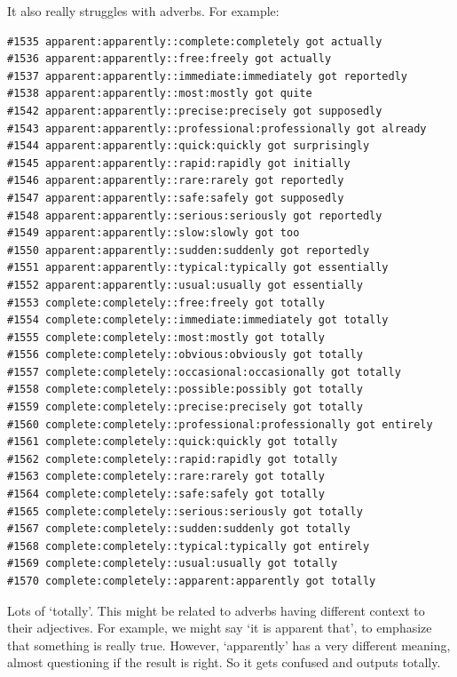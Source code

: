 \documentclass[12pt]{article}
\theoremstyle{definitionstyle}
\begin{document}
\begin{enumerate}[leftmargin=\labelsep]
\begin{enumerate}[label=\textbf{(\alph*)}]
                 It also really struggles with adverbs. For example:
                 \begin{lstlisting}
#1535 apparent:apparently::complete:completely got actually
#1536 apparent:apparently::free:freely got actually
#1537 apparent:apparently::immediate:immediately got reportedly
#1538 apparent:apparently::most:mostly got quite
#1542 apparent:apparently::precise:precisely got supposedly
#1543 apparent:apparently::professional:professionally got already
#1544 apparent:apparently::quick:quickly got surprisingly
#1545 apparent:apparently::rapid:rapidly got initially
#1546 apparent:apparently::rare:rarely got reportedly
#1547 apparent:apparently::safe:safely got supposedly
#1548 apparent:apparently::serious:seriously got reportedly
#1549 apparent:apparently::slow:slowly got too
#1550 apparent:apparently::sudden:suddenly got reportedly
#1551 apparent:apparently::typical:typically got essentially
#1552 apparent:apparently::usual:usually got essentially
#1553 complete:completely::free:freely got totally
#1554 complete:completely::immediate:immediately got totally
#1555 complete:completely::most:mostly got totally
#1556 complete:completely::obvious:obviously got totally
#1557 complete:completely::occasional:occasionally got totally
#1558 complete:completely::possible:possibly got totally
#1559 complete:completely::precise:precisely got totally
#1560 complete:completely::professional:professionally got entirely
#1561 complete:completely::quick:quickly got totally
#1562 complete:completely::rapid:rapidly got totally
#1563 complete:completely::rare:rarely got totally
#1564 complete:completely::safe:safely got totally
#1565 complete:completely::serious:seriously got totally
#1567 complete:completely::sudden:suddenly got totally
#1568 complete:completely::typical:typically got entirely
#1569 complete:completely::usual:usually got totally
#1570 complete:completely::apparent:apparently got totally
                 \end{lstlisting}
                 Lots of `totally'. This might be related to adverbs having different context to their adjectives. For example, we might say `it is apparent that', to emphasize that something is really true. However, `apparently' has a very different meaning, almost questioning if the result is right. So it gets confused and outputs totally.
        \end{enumerate}
    \end{enumerate}
\end{document}
